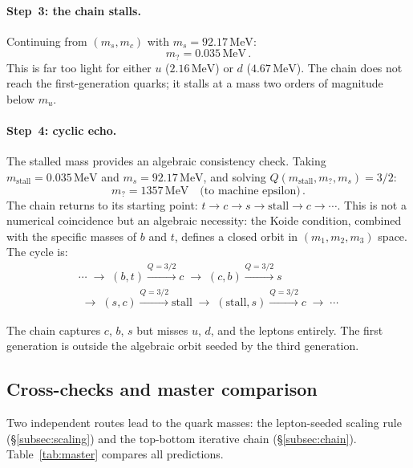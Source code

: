 \documentclass[12pt,a4paper]{article}
\newcommand{\MeV}{\,\text{MeV}}
\begin{document}
\paragraph{Step~3: the chain stalls.}
Continuing from $(m_s, m_c)$ with $m_s = 92.17\MeV$:
\begin{equation}
m_? = 0.035\MeV\,.
\end{equation}
This is far too light for either $u$ ($2.16\MeV$) or $d$
($4.67\MeV$). The chain does not reach the first-generation quarks;
it stalls at a mass two orders of magnitude below $m_u$.

\paragraph{Step~4: cyclic echo.}
The stalled mass provides an algebraic consistency check.
Taking $m_{\text{stall}} = 0.035\MeV$ and $m_s = 92.17\MeV$, and
solving $Q(m_{\text{stall}}, m_?, m_s) = 3/2$:
\begin{equation}
m_? = 1357\MeV \quad \text{(to machine epsilon)}\,.
\end{equation}
The chain returns to its starting point: $t \to c \to s \to
\text{stall} \to c \to \cdots$. This is not a numerical coincidence
but an algebraic necessity: the Koide condition, combined with the
specific masses of $b$ and $t$, defines a closed orbit in
$(m_1, m_2, m_3)$ space. The cycle is:
\begin{multline*}
\cdots \;\to\; (b,t) \xrightarrow{Q=3/2} c
\;\to\; (c,b) \xrightarrow{Q=3/2} s \\
\;\to\; (s,c) \xrightarrow{Q=3/2} \text{stall}
\;\to\; (\text{stall}, s) \xrightarrow{Q=3/2} c
\;\to\; \cdots
\end{multline*}

The chain captures $c$, $b$, $s$ but misses $u$, $d$, and the
leptons entirely. The first generation is outside the algebraic
orbit seeded by the third generation.

\subsection{Cross-checks and master comparison}
Two independent routes lead to the quark masses: the
lepton-seeded scaling rule (\S\ref{subsec:scaling}) and the
top-bottom iterative chain (\S\ref{subsec:chain}).
Table~\ref{tab:master} compares all predictions.
\end{document}
